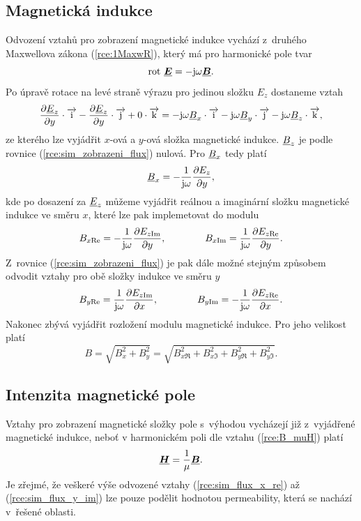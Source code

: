\subsection*{Magnetická indukce}
Odvození vztahů pro zobrazení magnetické indukce vychází z~druhého Maxwellova zákona (\ref{rce:1MaxwR}), který má pro harmonické pole tvar
\begin{displaymath}
	\mathrm{rot}\ \mbox{\underline{\boldmath$E$}} = -\mathrm{j}\omega\mbox{\underline{\boldmath$B$}}.
\end{displaymath}
Po úpravě rotace na levé straně výrazu pro jedinou složku $E_z$ dostaneme vztah
\begin{equation}
	\frac{\partial {\underline{E}}_z}{\partial y}\cdot\overrightarrow{\mathrm{i}} - \frac{\partial {\underline{E}}_z}{\partial y}\cdot\overrightarrow{\mathrm{j}} + 0\cdot\overrightarrow{\mathrm{k}} = -\mathrm{j}\omega {\underline{B}}_x\cdot\overrightarrow{\mathrm{i}} - \mathrm{j}\omega{\underline{B}}_y\cdot\overrightarrow{\mathrm{j}} - \mathrm{j}\omega{\underline{B}}_z\cdot\overrightarrow{\mathrm{k}},
	\label{rce:sim_zobrazeni_flux}
\end{equation}
ze kterého lze vyjádřit $x$-ová a $y$-ová složka magnetické indukce. ${\underline{B}}_z$ je podle rovnice (\ref{rce:sim_zobrazeni_flux}) nulová. Pro ${\underline{B}}_x$ tedy platí
\begin{displaymath}
	{\underline{B}}_x = -\frac{1}{\mathrm{j}\omega}\frac{\partial E_z}{\partial y},
\end{displaymath}
kde po dosazení za ${\underline{E}}_z$ můžeme vyjádřit reálnou a imaginární složku magnetické indukce ve směru $x$, které lze pak implemetovat do modulu
\begin{equation}
	B_{x\mathrm{Re}} = -\frac{1}{\mathrm{j}\omega}\frac{\partial E_{z\mathrm{Im}}}{\partial y}, \qquad \qquad B_{x\mathrm{Im}} = \frac{1}{\mathrm{j}\omega}\frac{\partial E_{z\mathrm{Re}}}{\partial y}.
	\label{rce:sim_flux_x_re}
\end{equation}
Z~rovnice (\ref{rce:sim_zobrazeni_flux}) je pak dále možné stejným způsobem odvodit vztahy pro obě složky indukce ve směru $y$
\begin{equation}
	B_{y\mathrm{Re}} = \frac{1}{\mathrm{j}\omega}\frac{\partial E_{z\mathrm{Im}}}{\partial x}, \qquad \qquad B_{y\mathrm{Im}} = -\frac{1}{\mathrm{j}\omega}\frac{\partial E_{z\mathrm{Re}}}{\partial x}.
	\label{rce:sim_flux_y_im}
\end{equation}
Nakonec zbývá vyjádřit rozložení modulu magnetické indukce. Pro jeho velikost platí
\begin{displaymath}
	B = \sqrt{B_{x}^{2} + B_{y}^{2}} = \sqrt{B_{x\Re}^{2} + B_{x\Im}^{2} + B_{y\Re}^{2} + B_{y\Im}^{2}}.
\end{displaymath}

\subsection*{Intenzita magnetické pole}
Vztahy pro zobrazení magnetické složky pole s~výhodou vycházejí již z~vyjádřené magnetické indukce, neboť v harmonickém poli dle vztahu (\ref{rce:B_muH}) platí
\begin{displaymath}
\mbox{\underline{\boldmath$H$}} = \frac{1}{\mu} \mbox{\underline{\boldmath$B$}}.
\end{displaymath}
Je zřejmé, že veškeré výše odvozené vztahy (\ref{rce:sim_flux_x_re}) až (\ref{rce:sim_flux_y_im}) lze pouze podělit hodnotou permeability, která se nachází v~řešené oblasti. 


